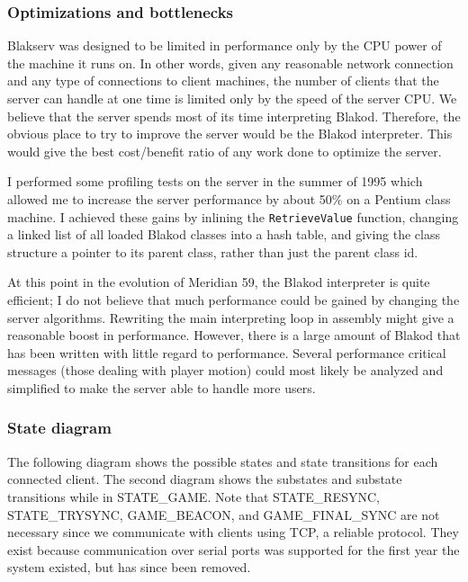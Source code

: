 \subsubsection{Optimizations and bottlenecks}

Blakserv was designed to be limited in performance only by the CPU power of the
machine it runs on.  In other words, given any reasonable network connection
and any type of connections to client machines, the number of clients that
the server can handle at one time is limited only by the speed of the server CPU.
We believe that the server spends most of its time interpreting Blakod.  Therefore,
the obvious place to try to improve the server would be the Blakod interpreter.
This would give the best cost/benefit ratio of any work done to optimize the server.

I performed some profiling tests on the server in the summer of 1995 which allowed
me to increase the server performance by about 50\% on a Pentium class machine.
I achieved these gains by inlining the \texttt{RetrieveValue} function, changing
a linked list of all loaded Blakod classes into a hash table, and giving the class
structure a pointer to its parent class, rather than just the parent class id.

At this point in the evolution of Meridian 59, the Blakod interpreter is quite
efficient; I do not believe that much performance could be gained by changing
the server algorithms.  Rewriting the main interpreting loop in assembly might
give a reasonable boost in performance.  However, there is a large amount of Blakod
that has been written with little regard to performance.  Several performance
critical messages (those dealing with player motion) could most likely be analyzed 
and simplified to make the server able to handle more users. 

\subsubsection{State diagram}
The following diagram shows the possible states and state transitions for
each connected client.  The second diagram shows the substates and substate
transitions while in STATE\_GAME.  Note that STATE\_RESYNC, STATE\_TRYSYNC,
GAME\_BEACON, and GAME\_FINAL\_SYNC are not necessary since we communicate
with clients using TCP, a reliable protocol.  They exist because communication
over serial ports was supported for the first year the system existed, but
has since been removed.

